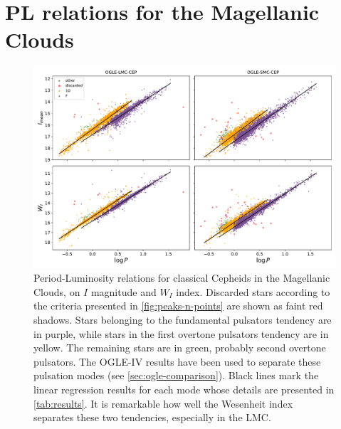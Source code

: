 

\section{PL relations for the Magellanic Clouds}

\begin{figure}
	\centering
	\includegraphics[width=\textwidth]{img/PL_result.pdf}
	\caption[PL relations for the Magellanic Clouds]{
		Period-Luminosity relations for classical Cepheids in the Magellanic Clouds, on $I$ magnitude and $W_I$ index.
		Discarded stars according to the criteria presented in \autoref{fig:peaks-n-points} are shown as faint red shadows.
		Stars belonging to the fundamental pulsators tendency are in purple, while stars in the first overtone pulsators tendency are in yellow.
		The remaining stars are in green, probably second overtone pulsators. The OGLE-IV results have been used to separate these pulsation modes (see \autoref{sec:ogle-comparison}).
		Black lines mark the linear regression results for each mode whose details are presented in \autoref{tab:results}.
		It is remarkable how well the Wesenheit index separates these two tendencies, especially in the LMC.
	}
	\label{fig:pl-result}
\end{figure}

